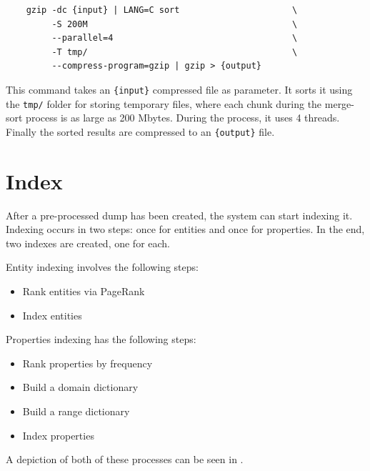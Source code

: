 \begin{verbatim}
    gzip -dc {input} | LANG=C sort                      \
         -S 200M                                        \
         --parallel=4                                   \
         -T tmp/                                        \
         --compress-program=gzip | gzip > {output}
\end{verbatim}

This command takes an \texttt{\{input\}} compressed file as parameter. It sorts it using the \texttt{tmp/} folder for storing temporary files, where each chunk during the merge-sort process is as large as 200 Mbytes. During the process, it uses 4 threads. Finally the sorted results are compressed to an \texttt{\{output\}} file.


\section{Index}
\label{chap:index}

After a pre-processed dump has been created, the system can start indexing it. 
Indexing occurs in two steps: once for entities and once for properties. In the end, two indexes are created, one for each.

Entity indexing involves the following steps:
\begin{itemize}
    \item Rank entities via PageRank
    \item Index entities
\end{itemize}

Properties indexing has the following steps:
\begin{itemize}
    \item Rank properties by frequency
    \item Build a domain dictionary
    \item Build a range dictionary
    \item Index properties
\end{itemize}

A depiction of both of these processes can be seen in .

